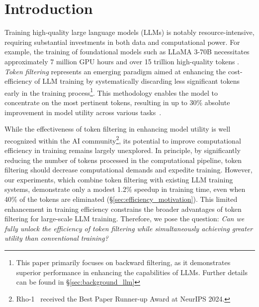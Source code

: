 \section{Introduction}

Training high-quality large language models (LLMs) is notably resource-intensive, requiring substantial investments in both data and computational power. For example, the training of foundational models such as LLaMA 3-70B necessitates approximately 7 million GPU hours and over 15 trillion high-quality tokens \cite{dubey2024llama}. \emph{Token filtering} represents an emerging paradigm aimed at enhancing the cost-efficiency of LLM training by systematically discarding less significant tokens early in the training process\footnote{This paper primarily focuses on backward filtering, as it demonstrates superior performance in enhancing the capabilities of LLMs. Further details can be found in \S\ref{sec:background_llm}}. This methodology enables the model to concentrate on the most pertinent tokens, resulting in up to 30\% absolute improvement in model utility across various tasks~\cite{RHO}.

While the effectiveness of token filtering in enhancing model utility is well recognized within the AI community\footnote{Rho-1~\cite{RHO} received the Best Paper Runner-up Award at NeurIPS 2024.}, its potential to improve computational efficiency in training remains largely unexplored. In principle, by significantly reducing the number of tokens processed in the computational pipeline, token filtering should decrease computational demands and expedite training. However, our experiments, which combine token filtering with existing LLM training systems, demonstrate only a modest 1.2\% speedup in training time, even when 40\% of the tokens are eliminated (\S\ref{sec:efficiency_motivation}). This limited enhancement in training efficiency constrains the broader advantages of token filtering for large-scale LLM training. Therefore, we pose the question: \emph{Can we fully unlock the efficiency of token filtering while simultaneously achieving greater utility than conventional training?}

